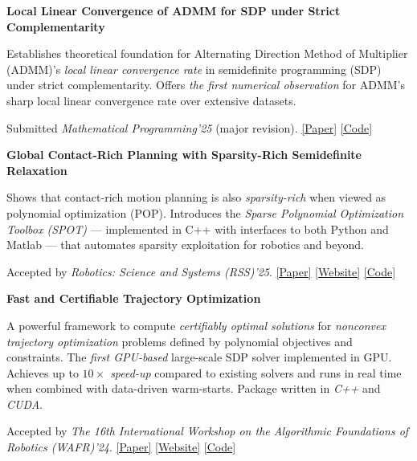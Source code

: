     \textbf{Local Linear Convergence of ADMM for SDP under Strict Complementarity}

    \vquad Establishes theoretical foundation for Alternating Direction Method of Multiplier (ADMM)'s \emph{local linear convergence rate} in semidefinite programming (SDP) under strict complementarity. Offers \emph{the first numerical observation} for ADMM's sharp local linear convergence rate over extensive datasets.
        
    \vquad Submitted \textit{Mathematical Programming'25} (major revision). 
    \href{https://arxiv.org/pdf/2503.20142}{[Paper]}
    \href{https://github.com/ComputationalRobotics/admmsdp-linearconv}{[Code]}

    \textbf{Global Contact-Rich Planning with Sparsity-Rich Semidefinite Relaxation}

    \vquad Shows that contact-rich motion planning is also \emph{sparsity-rich} when viewed as polynomial optimization (POP). Introduces the \emph{Sparse Polynomial Optimization Toolbox (SPOT)} — implemented in C++ with interfaces to both Python and Matlab — that automates sparsity exploitation for robotics and beyond.

    \vquad Accepted by \textit{Robotics: Science and Systems (RSS)'25}. 
    \href{https://arxiv.org/pdf/2406.05846}{[Paper]} 
    \href{https://computationalrobotics.seas.harvard.edu/project-spot/}{[Website]}
    \href{https://github.com/ComputationalRobotics/SPOT}{[Code]}
    

    \textbf{Fast and Certifiable Trajectory Optimization} 

    \vquad A powerful framework to compute \emph{certifiably optimal solutions} for \emph{nonconvex trajectory optimization} problems defined by polynomial objectives and constraints. The \emph{first GPU-based} large-scale SDP solver implemented in GPU. Achieves up to \emph{$10\times$ speed-up} compared to existing solvers and runs in real time when combined with data-driven warm-starts. Package written in \emph{C++} and \emph{CUDA}.
        
    \vquad Accepted by \textit{The 16th International Workshop on the Algorithmic Foundations of Robotics (WAFR)'24}. \href{https://arxiv.org/pdf/2502.02829}{[Paper]} 
    \href{https://computationalrobotics.seas.harvard.edu/project-strom/}{[Website]}
    \href{https://github.com/ComputationalRobotics/cuADMM}{[Code]}


